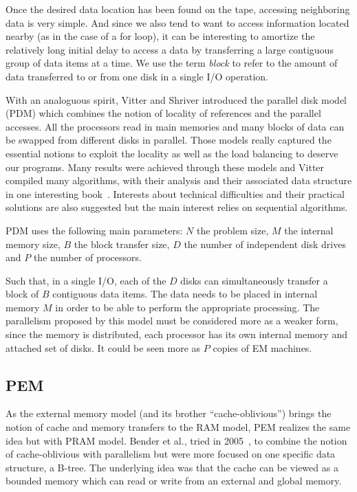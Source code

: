 Once the desired data location has been found on the tape, accessing neighboring data is very simple. And since we also tend to want to access information located nearby (as in the case of a for loop), it can be interesting to amortize the relatively long initial delay to access a data by transferring a large contiguous group of data items at a time. We use the term \textit{block} to refer to the amount of data transferred to or from one disk in a single I/O operation.

With an analoguous spirit, Vitter and Shriver introduced the parallel disk model (PDM) which combines the notion of locality of references and the parallel accesses. All the processors read in main memories and many blocks of data can be swapped from different disks in parallel. Those models really captured the essential notions to exploit the locality as well as the load balancing to deserve our programs. Many results were achieved through these models and Vitter compiled many algorithms, with their analysis and their associated data structure in one interesting book~\cite{vitter2008algorithms}. Interests about technical difficulties and their practical solutions are also suggested but the main interest relies on sequential algorithms.

PDM uses the following main parameters: $N$ the problem size, $M$ the internal memory size, $B$ the block transfer size, $D$ the number of independent disk drives and $P$ the number of processors.

Such that, in a single I/O, each of the $D$ disks can simultaneously transfer a block of $B$ contiguous data items. The data needs to be placed in internal memory $M$ in order to be able to perform the appropriate processing. The parallelism proposed by this model must be considered more as a weaker form, since the memory is distributed, each processor has its own internal memory and attached set of disks. It could be seen more as $P$ copies of EM machines.

\subsection{PEM}

As the external memory model (and its brother ``cache-oblivious'') brings the notion of cache and memory transfers to the RAM model, PEM realizes the same idea but with PRAM model. Bender et al., tried in 2005~\cite{bender2005concurrent}, to combine the notion of cache-oblivious with parallelism but were more focused on one specific data structure, a B-tree. The underlying idea was that the cache can be viewed as a bounded memory which can read or write from an external and global memory.

